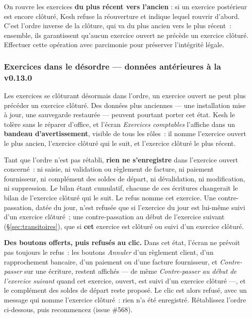 \documentclass[a4paper,11pt,oneside]{article}
\begin{document}
\begin{keshtip}
On rouvre les exercices \textbf{du plus récent vers l'ancien} : si un exercice postérieur est encore clôturé, Kesh refuse la réouverture et indique lequel rouvrir d'abord. C'est l'ordre inverse de la clôture, qui va du plus ancien vers le plus récent~: ensemble, ils garantissent qu'aucun exercice ouvert ne précède un exercice clôturé. Effectuer cette opération avec parcimonie pour préserver l'intégrité légale.
\end{keshtip}

\subsubsection{Exercices dans le désordre --- données antérieures à la v0.13.0}\label{sec:exercices-desordre}

Les exercices se clôturant désormais dans l'ordre, un exercice ouvert ne peut plus précéder un exercice clôturé. Des données plus anciennes --- une installation mise à jour, une sauvegarde restaurée --- peuvent pourtant porter cet état. Kesh le tolère sans le réparer d'office, et l'écran \emph{Exercices comptables} l'affiche dans un \textbf{bandeau d'avertissement}, visible de tous les rôles~: il nomme l'exercice ouvert le plus ancien, l'exercice clôturé qui le suit, et l'exercice clôturé le plus récent.

Tant que l'ordre n'est pas rétabli, \textbf{rien ne s'enregistre} dans l'exercice ouvert concerné~: ni saisie, ni validation ou règlement de facture, ni paiement fournisseur, ni complément des soldes de départ, ni dévalidation, ni modification, ni suppression. Le bilan étant cumulatif, chacune de ces écritures changerait le bilan de l'exercice clôturé qui le suit. Le refus nomme cet exercice. Une contre-passation, datée du jour, n'est refusée que si l'exercice du jour est lui-même suivi d'un exercice clôturé~; une contre-passation au début de l'exercice suivant (\S\ref{sec:transitoires}), que si \textbf{cet} exercice est clôturé ou suivi d'un exercice clôturé.

\textbf{Des boutons offerts, puis refusés au clic.} Dans cet état, l'écran ne prévoit pas toujours le refus~: les boutons \emph{Annuler} d'un règlement client, d'un rapprochement bancaire, d'un paiement ou d'une facture fournisseur, et \emph{Contre-passer} sur une écriture, restent affichés --- de même \emph{Contre-passer au début de l'exercice suivant} quand cet exercice, ouvert, est suivi d'un exercice clôturé ---, et le complément des soldes de départ reste proposé. Le clic est alors refusé, avec un message qui nomme l'exercice clôturé~: rien n'a été enregistré. Rétablissez l'ordre ci-dessous, puis recommencez (issue \#568).
\end{document}
